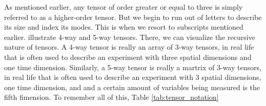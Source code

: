     As mentioned earlier, any tensor of order greater or equal to three is
    simply referred to as a higher-order tensor. But we begin to run out of
    letters to describe its size and index its modes. This is when we resort
    to subscripts mentioned earlier.  illustrate
    4-way and 5-way tensors. There, we can visualize the recursive nature of
    tensors. A 4-way tensor is really an array of 3-way tensors, in real
    life that is often used to describe an experiment with three spatial
    dimensions and one time dimension. Similarly, a 5-way tensor is really a
    martrix of 3-way tensors, in real life that is often used to describe an
    experiment with 3 spatial dimensions, one time dimension, and and a
    certain amount of variables being measured is the fifth fimension. To
    remember all of this, Table \ref{tab:tensor_notation}

    \newcommand{\drawcube}[1]{
        \def\ix{2} %
        \def\iy{2} %
        \def\iz{1.5} %
        \def\corescale{1}
        \def\rot{90}
        \def\r{0.25} %
        \def\rx{\ix/\corescale}
        \def\ry{\iy/\corescale}
        \def\rz{\iz/\corescale}

        \begin{tikzpicture}[scale=#1, every node/.style={inner sep=0pt}] %
            \coordinate (TFrontLowerLeft) at (0,0);
            \draw (TFrontLowerLeft) rectangle ++ (\rx,\ry); %

            \begin{scope}[shift={(TFrontLowerLeft)}, canvas is zx plane at y=\ry,rotate=\rot]
            \draw (0,0) rectangle ++ (\rx,\rz);
            \end{scope}

            \begin{scope}[shift={(TFrontLowerLeft)},canvas is zy plane at x=\rx,rotate=\rot]
            \draw (0,0) rectangle ++ (\ry,\rz);
            \end{scope}
        \end{tikzpicture}
    }

